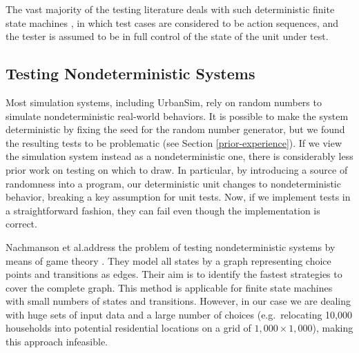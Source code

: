 The vast majority of the testing literature deals with such deterministic
finite state machines \cite{lee:1996,sidhu:1989,yannakakis:1991}, in which
test cases are considered to be action sequences, and the tester is assumed
to be in full control of the state of the unit under test.

\subsection{Testing Nondeterministic Systems}

Most simulation systems, including UrbanSim, rely on random numbers
to simulate nondeterministic real-world behaviors.  It is
possible to make the system deterministic by fixing the seed for the random
number generator, but we found the resulting tests to be problematic
(see Section \ref{prior-experience}).  If we view the simulation system instead
as a nondeterministic one, there is considerably less prior work on testing on
which to draw.  In particular, by introducing a source of randomness into a
program, our deterministic unit changes to nondeterministic behavior,
breaking a key assumption for unit tests.  Now, if we implement tests in a
straightforward fashion, they can fail even though the implementation is
correct.


Nachmanson et al.\@ address the problem of testing nondeterministic systems by 
means of game theory \cite{nachmanson:2004}. They model all states by a graph 
representing choice points and transitions as edges. Their aim is to identify 
the fastest strategies to cover the complete graph. This method is applicable 
for finite state machines with small numbers of states and transitions.
However, in our case we are dealing with huge sets of input data and a large
number of choices (e.g.\ relocating 10,000 households into potential
residential locations on a grid of $1,000\times 1,000$), making this
approach infeasible.

